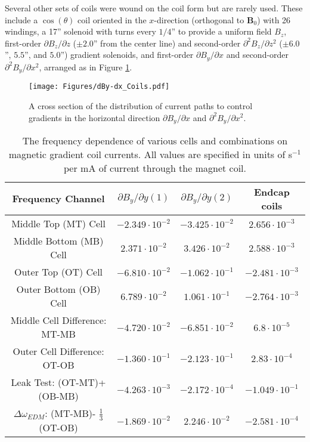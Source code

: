 \documentclass [10pt, twoside] {uwthesis}[2012/04/02]
\begin{document}
Several other sets of coils were wound on the coil form but are rarely used. These include a $\cos(\theta)$ coil oriented in the $x$-direction (orthogonal to $\mathbf{B}_0$) with 26 windings, a 17'' solenoid with turns every $1/4$'' to provide a uniform field $B_z$, first-order $\partial B_z/\partial z$ ($\pm 2.0$'' from the center line) and second-order $\partial^2 B_z/\partial z^2$ ($\pm 6.0$'', $5.5$'', and $5.0$'') gradient solenoids, and first-order $\partial B_y/\partial x$ and second-order $\partial^2 B_y/\partial x^2$, arranged as in Figure \ref{dBy-dx_Coils}.

\begin{figure}[ht]
\begin{center}
\texttt{[image: Figures/dBy-dx\_Coils.pdf]}
\end{center}
\caption[Horizontal gradient coil current pattern]
{\narrower A cross section of the distribution of current paths to control gradients in the horizontal direction $\partial B_y/\partial x$ and $\partial^2 B_y/\partial x^2$.}
\label{dBy-dx_Coils}
\end{figure}

\begin{table}[ht]
\begin{center} 																							
\caption[Cell frequency dependence on magnet coil currents] 
{\narrower The frequency dependence of various cells and combinations on magnetic gradient coil currents. All values are specified in units of s$^{-1}$ per mA of current through the magnet coil.} \label{Grad_Coil_Current_vs_Freq}	
\begin{tabular}{cccc}
\hline \hline 
Frequency Channel & $\partial B_y/\partial y (1)$ & $\partial B_y/\partial y (2)$ & Endcap coils  \\ [0.5ex]	
\hline                   														
Middle Top (MT) Cell & $-2.349\cdot 10^{-2}$ & $-3.425\cdot 10^{-2}$ & $2.656\cdot 10^{-3}$ \\
Middle Bottom (MB) Cell &  $2.371\cdot 10^{-2}$ &  $3.426\cdot 10^{-2}$ & $2.588\cdot 10^{-3}$ \\ 
Outer Top (OT) Cell & $-6.810\cdot 10^{-2}$ & $-1.062\cdot 10^{-1}$ & $-2.481\cdot 10^{-3}$ \\
Outer Bottom (OB) Cell &  $6.789\cdot 10^{-2}$ &  $1.061\cdot 10^{-1}$ & $-2.764\cdot 10^{-3}$ \\ 		 
Middle Cell Difference: MT-MB & $-4.720\cdot 10^{-2}$ & $-6.851\cdot 10^{-2}$ & $6.8\cdot 10^{-5}$ \\
Outer Cell Difference: OT-OB & $-1.360\cdot 10^{-1}$ & $-2.123\cdot 10^{-1}$ & $2.83\cdot 10^{-4}$ \\
Leak Test: (OT-MT)+(OB-MB) & $-4.263\cdot 10^{-3}$ & $-2.172\cdot 10^{-4}$ & $-1.049\cdot 10^{-1}$ \\
$\Delta\omega_{EDM}$: (MT-MB)- $\frac{1}{3}$(OT-OB) & $-1.869\cdot 10^{-2}$ & $2.246\cdot 10^{-2}$ & $-2.581\cdot 10^{-4}$ \\  
[1ex]	
\hline
\end{tabular}
\end{center} 														
\end{table}
\end{document}
